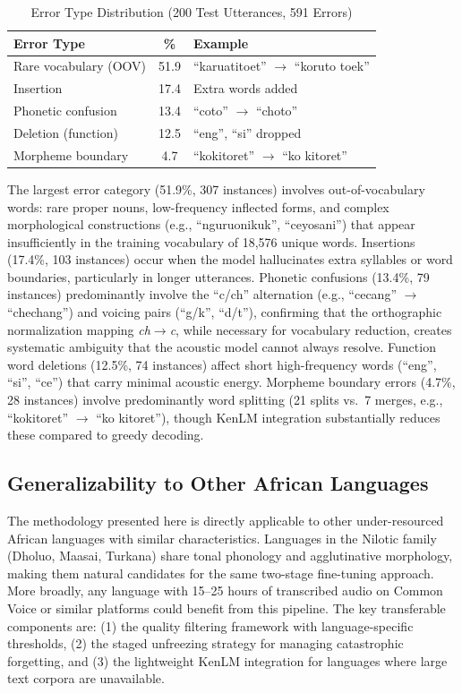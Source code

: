 \documentclass[conference]{IEEEtran}
\begin{document}
\begin{table}[!t]
\caption{Error Type Distribution (200 Test Utterances, 591 Errors)}
\label{tab:errors}
\centering
\small
\begin{tabular}{|p{}|c|p{}|}
\hline
\textbf{Error Type} & \textbf{\%} & \textbf{Example} \\
\hline
\hline
Rare vocabulary (OOV) & 51.9 & ``karuatitoet'' $\rightarrow$ ``koruto toek'' \\
\hline
Insertion & 17.4 & Extra words added \\
\hline
Phonetic confusion & 13.4 & ``coto'' $\rightarrow$ ``choto'' \\
\hline
Deletion (function) & 12.5 & ``eng'', ``si'' dropped \\
\hline
Morpheme boundary & 4.7 & ``kokitoret'' $\rightarrow$ ``ko kitoret'' \\
\hline
\end{tabular}
\end{table}

The largest error category (51.9\%, 307 instances) involves out-of-vocabulary words: rare proper nouns, low-frequency inflected forms, and complex morphological constructions (e.g., ``nguruonikuk'', ``ceyosani'') that appear insufficiently in the training vocabulary of 18,576 unique words. Insertions (17.4\%, 103 instances) occur when the model hallucinates extra syllables or word boundaries, particularly in longer utterances. Phonetic confusions (13.4\%, 79 instances) predominantly involve the ``c/ch'' alternation (e.g., ``cecang'' $\rightarrow$ ``chechang'') and voicing pairs (``g/k'', ``d/t''), confirming that the orthographic normalization mapping \textit{ch}$\rightarrow$\textit{c}, while necessary for vocabulary reduction, creates systematic ambiguity that the acoustic model cannot always resolve. Function word deletions (12.5\%, 74 instances) affect short high-frequency words (``eng'', ``si'', ``ce'') that carry minimal acoustic energy. Morpheme boundary errors (4.7\%, 28 instances) involve predominantly word splitting (21 splits vs.\ 7 merges, e.g., ``kokitoret'' $\rightarrow$ ``ko kitoret''), though KenLM integration substantially reduces these compared to greedy decoding.

\subsection{Generalizability to Other African Languages}

The methodology presented here is directly applicable to other under-resourced African languages with similar characteristics. Languages in the Nilotic family (Dholuo, Maasai, Turkana) share tonal phonology and agglutinative morphology, making them natural candidates for the same two-stage fine-tuning approach. More broadly, any language with 15--25 hours of transcribed audio on Common Voice or similar platforms could benefit from this pipeline. The key transferable components are: (1) the quality filtering framework with language-specific thresholds, (2) the staged unfreezing strategy for managing catastrophic forgetting, and (3) the lightweight KenLM integration for languages where large text corpora are unavailable.
\end{document}
